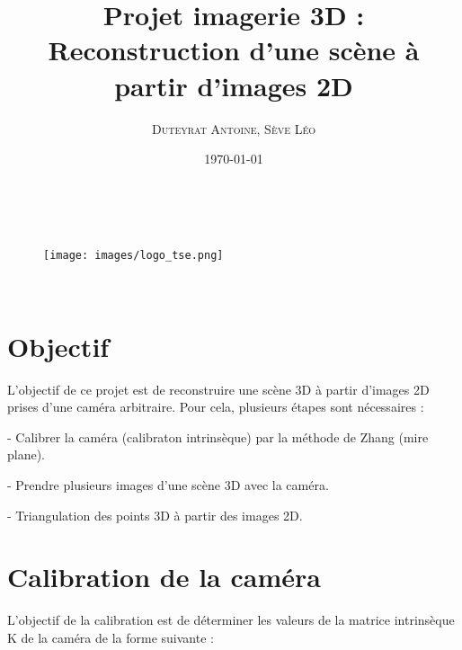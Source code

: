 \documentclass[12pt]{article}
\title{\textbf{Projet imagerie 3D : Reconstruction d'une scène à partir d'images 2D}}
\author{
    \textsc{Duteyrat Antoine},
    \textsc{Sève Léo}
}
\date{\today}
\makeatletter
\let\titre\@title %
\let\auteurs\@author %
\let\date\@date %
\makeatother
\begin{document}
\begin{titlepage}
    \begin{center}
        \vskip 1.5cm
        {\color {couleur}{\huge \bf \titre}}\\[5mm] %
        \vskip 0.5cm
        \begin{figure}[h]
        \centering
        \texttt{[image: images/logo\_tse.png]}
        \end{figure}
        \vskip 1cm %
        {\large \auteurs}\\ %
        \vskip 0.5cm %
        \vfill
        \vskip 0.2cm
        \date %
      \end{center}
\end{titlepage}
\clearpage

\tableofcontents

\newpage

\section{Objectif}

L'objectif de ce projet est de reconstruire une scène 3D à partir d'images 2D prises d'une caméra arbitraire.
Pour cela, plusieurs étapes sont nécessaires :

- Calibrer la caméra (calibraton intrinsèque) par la méthode de Zhang (mire plane).

- Prendre plusieurs images d'une scène 3D avec la caméra.

- Triangulation des points 3D à partir des images 2D.

\newpage

\section{Calibration de la caméra}

L'objectif de la calibration est de déterminer les valeurs de la matrice intrinsèque K de la caméra de la forme suivante :
\end{document}
